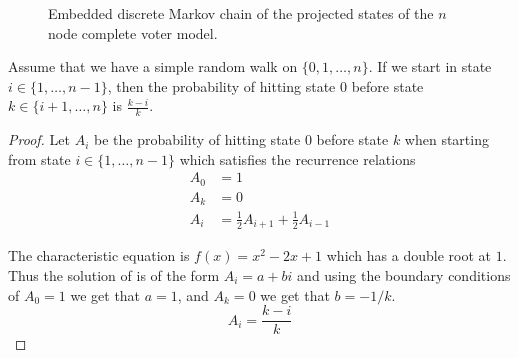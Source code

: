 \begin{figure}[H]
  \centering
{}
\caption{Embedded discrete Markov chain of the projected states of the $n$ node complete voter model.}
  \label{fig:rw_voter_model_discrete}
\end{figure}

\begin{lemma}\label{lem:rw_hit_zero}
Assume that we have a simple random walk on $\{0,1,\ldots, n\}$.
If we start in state $i \in \{1,\ldots, n - 1\}$, then the probability of hitting state 0 before state $k \in \{i + 1, \ldots, n\}$ is $\frac{k - i}{k}$.
\end{lemma}

\begin{proof}
Let $A_i$ be the probability of hitting state 0 before state $k$ when starting from state $i \in \{1,\ldots, n - 1\}$ which satisfies the recurrence relations
\begin{align*}
    A_0 &= 1\\
    A_{k} &= 0\\
    A_i &= \frac{1}{2} A_{i + 1} + \frac{1}{2} A_{i - 1}
\end{align*}

The characteristic equation is $f(x) = x^2 - 2x + 1$ which has a double root at $1$.
Thus the solution of is of the form $A_i = a + bi$ and using the boundary conditions of $A_0 = 1$ we get that $a = 1$, and $A_{k} = 0$ we get that $b = - 1/k$.
$$
A_i = \frac{k - i}{k}
$$
\end{proof}

